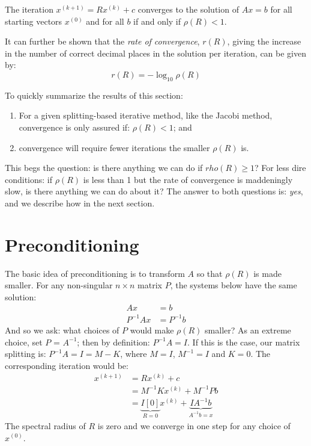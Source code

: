 \begin{theorem}
The iteration $x^{(k+1)} = Rx^{(k)} + c$ converges to the solution of $Ax=b$ for all starting vectors $x^{(0)}$ and for all $b$ if and only if $\rho(R)<1$.
\end{theorem}
It can further be shown that the \emph{rate of convergence}, $r(R)$, giving the increase in the number of correct decimal places in the solution per iteration, can be given by:
\begin{equation}
r(R) = -\log_{10}\rho(R)
\end{equation}

To quickly summarize the results of this section:
\begin{enumerate}
\item For a given splitting-based iterative method, like the Jacobi method, convergence is only assured if: $\rho(R)< 1$; and
\item convergence will require fewer iterations the smaller $\rho(R)$ is.
\end{enumerate}

This begs the question: is there anything we can do if $rho(R)\ge 1$?  For less dire conditions: if $\rho(R)$ is less than 1 but the rate of convergence is maddeningly slow, is there anything we can do about it?  The answer to both questions is: \emph{yes}, and we describe how in the next section.

\section{Preconditioning}
The basic idea of preconditioning is to transform $A$ so that $\rho(R)$ is made smaller.  For any non-singular $n \times n$ matrix $P$, the systems below have the same solution:
\begin{align*}
Ax &= b \\
P^{-1}Ax &= P^{-1}b
\end{align*}
And so we ask: what choices of $P$ would make $\rho(R)$ smaller?  As an extreme choice, set $P$ = $A^{-1}$; then by definition: $P^{-1}A = I$.  If this is the case, our matrix splitting is: $P^{-1}A = I = M - K$, where $M=I$, $M^{-1}=I$ and $K=0$.  The corresponding iteration would be:
\begin{align*}
x^{(k+1)} &= Rx^{(k)} + c \\
&= M^{-1}Kx^{(k)} + M^{-1}Pb \\
&= \underbrace{I[0]}_{R = 0}x^{(k)} + \underbrace{IA^{-1}b}_{A^{-1}b = x}
\end{align*}
The spectral radius of $R$ is zero and we converge in one step for any choice of $x^{(0)}$.

